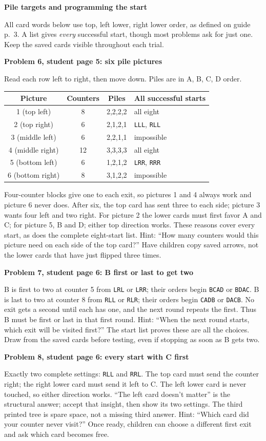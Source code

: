 \documentclass[11pt]{article}
\newcommand{\head}[1]{\par\textbf{\large #1}\par}
\newcommand{\sub}[1]{\par\textbf{#1}\par}
\newcommand{\code}[1]{\texttt{#1}}
\begin{document}
\head{Pile targets and programming the start}
All card words below use top, left lower, right lower order, as defined on guide p.\ 3. A list gives \emph{every} successful start, though most problems ask for just one. Keep the saved cards visible throughout each trial.

\sub{Problem 6, student page 5: six pile pictures}
Read each row left to right, then move down. Piles are in A, B, C, D order.
\begin{center}
\begin{tabular}{cccl}
\toprule
Picture & Counters & Piles & All successful starts\\
\midrule
1 (top left) & 8 & 2,2,2,2 & all eight\\
2 (top right) & 6 & 2,1,2,1 & \code{LLL}, \code{RLL}\\
3 (middle left) & 6 & 2,2,1,1 & impossible\\
4 (middle right) & 12 & 3,3,3,3 & all eight\\
5 (bottom left) & 6 & 1,2,1,2 & \code{LRR}, \code{RRR}\\
6 (bottom right) & 8 & 3,1,2,2 & impossible\\
\bottomrule
\end{tabular}
\end{center}
Four-counter blocks give one to each exit, so pictures 1 and 4 always work and picture 6 never does. After six, the top card has sent three to each side; picture 3 wants four left and two right. For picture 2 the lower cards must first favor A and C; for picture 5, B and D; either top direction works. These reasons cover every start, as does the complete eight-start list. Hint: ``How many counters would this picture need on each side of the top card?'' Have children copy saved arrows, not the lower cards that have just flipped three times.

\sub{Problem 7, student page 6: B first or last to get two}
B is first to two at counter 5 from \code{LRL} or \code{LRR}; their orders begin \code{BCAD} or \code{BDAC}. B is last to two at counter 8 from \code{RLL} or \code{RLR}; their orders begin \code{CADB} or \code{DACB}. No exit gets a second until each has one, and the next round repeats the first. Thus B must be first or last in that first round. Hint: ``When the next round starts, which exit will be visited first?'' The start list proves these are all the choices. Draw from the saved cards before testing, even if stopping as soon as B gets two.

\sub{Problem 8, student page 6: every start with C first}
Exactly two complete settings: \code{RLL} and \code{RRL}. The top card must send the counter right; the right lower card must send it left to C. The left lower card is never touched, so either direction works. ``The left card doesn't matter'' is the structural answer; accept that insight, then show its two settings. The third printed tree is spare space, not a missing third answer. Hint: ``Which card did your counter never visit?'' Once ready, children can choose a different first exit and ask which card becomes free.
\end{document}
